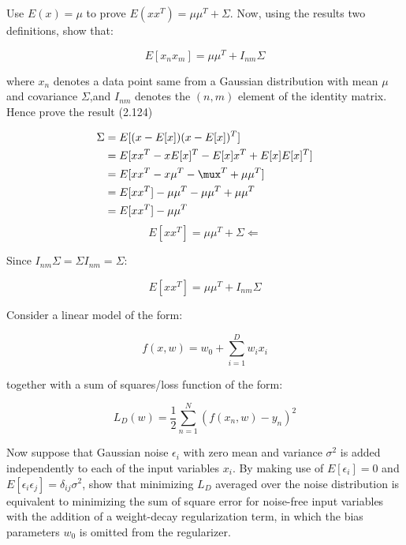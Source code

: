 \documentclass{homework}
\begin{document}
\newpage
\begin{problem}[2]
    Use $E(x) = \mu$ to prove $E(xx^T)=\mu\mu^T+\Sigma$. Now, using the results two definitions, show that:
    
    $$
    E[x_n x_m] = \mu\mu^T + I_{nm}\Sigma
    $$

    where $x_n$ denotes a data point same from a Gaussian distribution with mean $\mu$ and covariance $\Sigma$,and $I_{nm}$ denotes the $(n,m)$ element of the identity matrix. Hence prove the result (2.124)
\end{problem}

\begin{solution}
    \begin{equation*}
        \begin{split}
            \Sigma   & = E[(x-E[x])(x-E[x])^T ] \\
                & = E[xx^T-xE[x]^T - E[x]x^T + E[x]E[x]^T] \\
                & = E[xx^T - x\mu^T -\mux^T +\mu\mu^T] \\
                & = E[xx^T] - \mu\mu^T -\mu\mu^T + \mu\mu^T \\
                & = E[xx^T] - \mu\mu^T
        \end{split}
    \end{equation*}
    \begin{equation*}
        E[xx^T] = \mu\mu^T + \Sigma \Leftarrow
    \end{equation*}

    Since $I_{nm}\Sigma = \Sigma I_{nm} = \Sigma$: 

    \begin{equation*}
        E[xx^T] = \mu\mu^T+I_{nm}\Sigma
    \end{equation*}
\end{solution}
\newpage
\begin{problem}[3]
    Consider a linear model of the form:

    $$
    f(x,w) = w_0 + \sum_{i=1}^D w_i x_i
    $$

    together with a sum of squares/loss function of the form:

    $$
    L_D(w) = \frac{1}{2} \sum_{n=1}^{N} (f(x_n,w)-y_n)^2
    $$

    Now suppose that Gaussian noise $\epsilon_i$ with zero mean and variance $\sigma^2$ is added independently to each of the input variables $x_i$. By making use of $E[\epsilon_i]=0$ and $E[\epsilon_i \epsilon_j]=\delta_{ij}\sigma^2$, show that minimizing $L_D$ averaged over the noise distribution is equivalent to minimizing the sum of square error for noise-free input variables with the addition of a weight-decay regularization term, in which the bias parameters $w_0$ is omitted from the regularizer.
\end{problem}
\end{document}
